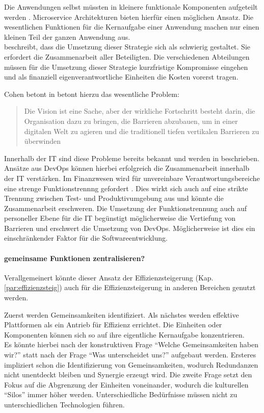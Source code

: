 Die Anwendungen selbst müssten in kleinere funktionale Komponenten aufgeteilt werden \cite{Bussmann2006}. Microservice Architekturen bieten hierfür einen möglichen Ansatz. Die wesentlichen Funktionen für die Kernaufgabe einer Anwendung machen nur einen kleinen Teil der ganzen Anwendung aus.
\medskip
\\
\citet{Gupta:2017} beschreibt, dass die Umsetzung dieser Strategie sich als schwierig gestaltet. Sie erfordert die Zusammenarbeit aller Beteiligten. Die verschiedenen Abteilungen müssen für die Umsetzung dieser Strategie kurzfristige Kompromisse eingehen und als finanziell eigenverantwortliche Einheiten die Kosten vorerst tragen. 

Cohen betont in \cite[Zitat, S.5]{Gupta:2017}
betont hierzu das wesentliche Problem:
\begin{quote}\label{quote:goldman-vision}
    Die Vision ist eine Sache, aber der wirkliche Fortschritt besteht darin, die Organisation dazu zu bringen, die Barrieren abzubauen, um in einer digitalen Welt zu agieren und die traditionell tiefen vertikalen Barrieren zu überwinden
\end{quote}
\medskip
Innerhalb der IT sind diese Probleme bereits bekannt und werden in \citet{Disterer2013} beschrieben. Ansätze aus DevOps \cite{Alt2017} können hierbei erfolgreich die Zusammenarbeit innerhalb der IT verstärken. Im Finanzwesen wird für unvereinbare Verantwortungsbereiche eine strenge Funktionstrennng gefordert \cite{MaRisk:2017}.
Dies wirkt sich auch auf eine strikte Trennung zwischen Test- und Produktivumgebung aus \citet{MaRisk:2017} und könnte die Zusammenarbeit erschweren. Die Umsetzung der Funktionstrennung auch auf personeller Ebene für die IT begünstigt möglicherweise die Vertiefung von Barrieren und erschwert die Umsetzung von DevOps. Möglicherweise ist dies ein einschränkender Faktor für die Softwareentwicklung.

\paragraph{gemeinsame Funktionen zentralisieren?}
Verallgemeinert könnte dieser Ansatz der Effizienzsteigerung (Kap. \ref{par:effizienzsteig}) auch für die Effizienzsteigerung in anderen Bereichen genutzt werden.

Zuerst werden Gemeinsamkeiten identifiziert. Als nächstes werden effektive Plattformen als ein Antrieb für Effizienz errichtet. Die Einheiten oder Komponenten können sich so auf ihre eigentliche Kernaufgabe konzentrieren. 
\medskip
\\
Es könnte hierbei nach der konstruktiven Frage \enquote{Welche Gemeinsamkeiten haben wir?} statt nach der Frage \enquote{Was unterscheidet uns?} aufgebaut werden. Ersteres impliziert schon die Identifizierung von Gemeinsamkeiten, wodurch Redundanzen nicht unentdeckt bleiben und Synergie erzeugt wird. Die zweite Frage setzt den Fokus auf die Abgrenzung der Einheiten voneinander, wodurch die kulturellen \enquote{Silos} immer höher werden. Unterschiedliche Bedürfnisse müssen nicht zu unterschiedlichen Technologien führen. 

